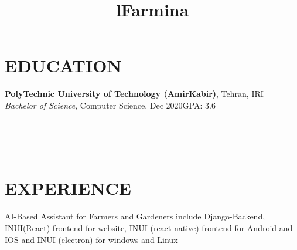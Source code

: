 \documentclass[margin]{res}
\begin{document}


\address{
    \href{https://github.com/MohammadrezaAmani}{GitHub}
    \\\href{https://www.linkedin.com/in/mohammadreza-amani/}{LinkedIn}
}

\address{
    \href{mailto:more.amani@yahoo.com}{Email}
    \\\href{tel:+989352462779}{+98-935-246-2779}
    \\\href{https://MohammadrezaAmani.github.io}{website}
}

\begin{resume}

\section{EDUCATION}
\textbf{PolyTechnic University of Technology (AmirKabir)}, Tehran, IRI\\
{\sl Bachelor of Science}, Computer Science, Dec 2020\hfill GPA: 3.6




\begin{format}
\title{l}\\
\\
\body\\
\end{format}

\section{EXPERIENCE}
\title{\textbf{Farmina}}
\begin{position}
AI-Based Assistant for Farmers and Gardeners include Django-Backend, INUI(React) frontend for website, INUI (react-native) frontend for Android and IOS and INUI (electron) for windows and Linux 
\end{position}


\end{resume}
\end{document}
